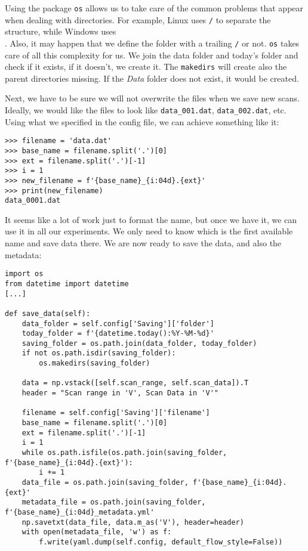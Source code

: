 {{{{Using the package \texttt{os} allows us to take care of the common problems that appear when dealing with directories. For example, Linux uses \texttt{/} to separate the structure, while Windows uses \texttt{\\}. Also, it may happen that we define the folder with a trailing \texttt{/} or not. \texttt{os} takes care of all this complexity for us. We join the data folder and today's folder and check if it exists, if it doesn't, we create it. The \texttt{makedirs} will create also the parent directories missing. If the \emph{Data} folder does not exist, it would be created. 

Next, we have to be sure we will not overwrite the files when we save new scans. Ideally, we would like the files to look like \texttt{data\_001.dat}, \texttt{data\_002.dat}, etc. Using what we specified in the config file, we can achieve something like it:

\begin{verbatim}
>>> filename = 'data.dat'
>>> base_name = filename.split('.')[0]
>>> ext = filename.split('.')[-1] 
>>> i = 1
>>> new_filename = f'{base_name}_{i:04d}.{ext}'
>>> print(new_filename)
data_0001.dat
\end{verbatim}

It seems like a lot of work just to format the name, but once we have it, we can use it in all our experiments. We only need to know which is the first available name and save data there. We are now ready to save the data, and also the metadata:

\begin{verbatim}
import os
from datetime import datetime
[...]

def save_data(self):
	data_folder = self.config['Saving']['folder']
	today_folder = f'{datetime.today():%Y-%M-%d}'
	saving_folder = os.path.join(data_folder, today_folder)
	if not os.path.isdir(saving_folder):
	    os.makedirs(saving_folder)
	
	data = np.vstack([self.scan_range, self.scan_data]).T
    header = "Scan range in 'V', Scan Data in 'V'"
    
    filename = self.config['Saving']['filename']
    base_name = filename.split('.')[0]
    ext = filename.split('.')[-1] 
    i = 1
    while os.path.isfile(os.path.join(saving_folder, f'{base_name}_{i:04d}.{ext}'):
        i += 1
    data_file = os.path.join(saving_folder, f'{base_name}_{i:04d}.{ext}'
    metadata_file = os.path.join(saving_folder, f'{base_name}_{i:04d}_metadata.yml'
    np.savetxt(data_file, data.m_as('V'), header=header)
    with open(metadata_file, 'w') as f:
        f.write(yaml.dump(self.config, default_flow_style=False))
\end{verbatim}

}}}}
